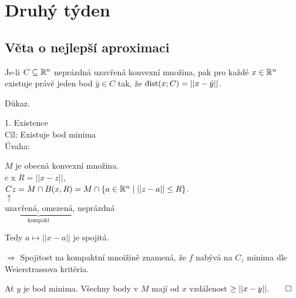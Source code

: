 \section{Druhý týden}

\subsection{Věta o nejlepší aproximaci}
Je-li $C \subseteq \mathbb{R}^n$ neprázdná uzavřená konvexní množina, pak pro každé $x \in \mathbb{R}^n$ existuje právě jeden bod 
$\hat y \in C$ tak, že $\operatorname*{dist} (x; C) = ||x-\hat y||$.

Důkaz.

1. Existence\\
Cíl: Existuje bod minima\\
Úvaha:
\begin{multicols}{2}


\columnbreak
    $M$ je obecná konvexní množina.\\c x
    $R = ||x-z||$,\\
    $Cz = M \cap B (x, R) = M \cap \left\lbrace a \in \mathbb{R}^n \mid ||z-a|| \leq R \right\rbrace$.\\
    $\uparrow$\\
    $\underbrace{\text{uzavřená, omezená}}_\text{kompakt}$, neprázdná

    Tedy $a \mapsto ||x-a||$ je spojitá.

    $\Rightarrow$ Spojitost na kompaktní mnoižině znamená, že $f$ nabývá na $C_z$ minima dle Weierstrassova kritéria.
\end{multicols}
Ať $y$ je bod minima. Všechny body v $M$ mají od $x$ vzdálenost $\geq ||x-y||. \qed$
\\

